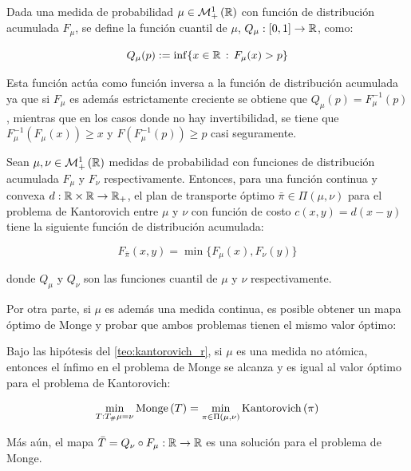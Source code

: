 \begin{defn}
	Dada una medida de probabilidad $\mu\in\mathcal{M}_+^1\left(\mathbb{R}\right)$ con función de distribución acumulada $F_\mu$, se define la función cuantil de $\mu$, $Q_\mu:[0,1]\to\mathbb{R}$, como:

	\begin{equation}
		Q_\mu(p) := \inf \{x\in\mathbb{R}\,:\, F_\mu(x)>p\}
	\end{equation}
\end{defn}

Esta función actúa como función inversa a la función de distribución acumulada ya que si $F_\mu$ es además estrictamente creciente se obtiene que $Q_\mu(p) = F_\mu^{-1}(p)$, mientras que en los casos donde no hay invertibilidad, se tiene que $F_\mu^{-1}(F_\mu(x)) \geq x$ y $F(F_\mu^{-1}(p)) \geq p$ casi seguramente.

\begin{teo}
	Sean $\mu,\nu\in\mathcal{M}_+^1\left(\mathbb{R}\right)$ medidas de probabilidad con funciones de distribución acumulada $F_\mu$ y $F_\nu$ respectivamente. Entonces, para una función continua y convexa $d:\mathbb{R}\times\mathbb{R}\to\mathbb{R}_+$, el plan de transporte óptimo $\bar\pi\in\Pi(\mu,\nu)$ para el problema de Kantorovich entre $\mu$ y $\nu$ con función de costo $c(x,y)=d(x-y)$ tiene la siguiente función de distribución acumulada:

	\begin{equation}
		F_{\bar\pi}(x,y) = \min \{F_\mu(x),F_\nu(y)\}
	\end{equation}

	donde $Q_\mu$ y $Q_\nu$ son las funciones cuantil de $\mu$ y $\nu$ respectivamente.
\end{teo}

Por otra parte, si $\mu$ es además una medida continua, es posible obtener un mapa óptimo de Monge y probar que ambos problemas tienen el mismo valor óptimo:

\begin{cor}
	Bajo las hipótesis del \autoref{teo:kantorovich_r}, si $\mu$ es una medida no atómica, entonces el ínfimo en el problema de Monge se alcanza y es igual al valor óptimo para el problema de Kantorovich:

	\begin{equation}
		\min_{T:T_\#\mu=\nu} \operatorname{Monge}\left(T\right) = \min_{\pi\in\Pi(\mu,\nu)} \operatorname{Kantorovich}\left(\pi\right)
	\end{equation}

	Más aún, el mapa $\bar T = Q_\nu \circ F_\mu:\mathbb{R}\to\mathbb{R}$ es una solución para el problema de Monge.
\end{cor}

